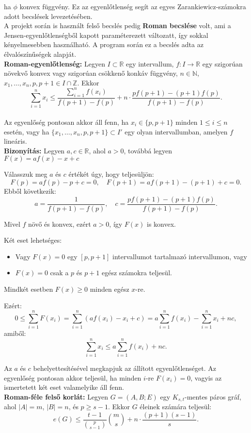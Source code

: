 \documentclass[12pt,a4paper]{article}
\begin{document}
ha $\phi$ konvex függvény. Ez az egyenlőtlenség segít az egyes Zarankiewicz-számokra adott becslések levezetésében.
\\[2mm]
A projekt során is használt felső becslés pedig \textbf{Roman becslése} volt, ami a Jensen-egyenlőtlenségből kapott paraméterezett változatt, így sokkal kényelmesebben használható. A program során ez a becslés adta az élvalószínűségek alapját.
\\[2mm]
\textbf{Roman-egyenlőtlenség:} Legyen $I \subset \mathbb{R}$ egy intervallum, $f : I \to \mathbb{R}$ egy szigorúan növekvő konvex vagy szigorúan csökkenő konkáv függvény, $n \in \mathbb{N}$, $x_1, \dots, x_n, p, p+1 \in I \cap \mathbb{Z}$. Ekkor
\[
\sum_{i=1}^{n} x_i \leq \frac{\sum_{i=1}^{n} f(x_i)}{f(p+1) - f(p)} + n \cdot \frac{p f(p+1) - (p+1) f(p)}{f(p+1) - f(p)}.
\]
\\[2mm]
Az egyenlőség pontosan akkor áll fenn, ha $x_i \in \{p, p+1\}$ minden $1 \leq i \leq n$ esetén, vagy ha $\{x_1, \dots, x_n, p, p+1\} \subset I'$ egy olyan intervallumban, amelyen $f$ lineáris.
\\[2mm]
\textbf{Bizonyítás:} Legyen $a, c \in \mathbb{R}$, ahol $a > 0$, továbbá legyen $F(x) = a f(x) - x + c$

Válasszuk meg $a$ és $c$ értékét úgy, hogy teljesüljön:
\[
F(p) = a f(p) - p + c = 0,\quad F(p+1) = a f(p+1) - (p+1) + c = 0.
\]
Ebből következik:
\[
a = \frac{1}{f(p+1) - f(p)},\quad c = \frac{p f(p+1) - (p+1) f(p)}{f(p+1) - f(p)}.
\]

Mivel $f$ növő és konvex, ezért $a > 0$, így $F(x)$ is konvex.

Két eset lehetséges:
\begin{itemize}
  \item Vagy $F(x) = 0$ egy $[p, p+1]$ intervallumot tartalmazó intervallumon, vagy
  \item $F(x) = 0$ csak a $p$ és $p+1$ egész számokra teljesül.
\end{itemize}
Mindkét esetben $F(x) \geq 0$ minden egész $x$-re.

Ezért:
\[
0 \leq \sum_{i=1}^n F(x_i) = \sum_{i=1}^n (a f(x_i) - x_i + c) = a \sum_{i=1}^n f(x_i) - \sum_{i=1}^n x_i + n c,
\]
amiből:
\[
\sum_{i=1}^n x_i \leq a \sum_{i=1}^n f(x_i) + n c.
\]

Az $a$ és $c$ behelyettesítésével megkapjuk az állított egyenlőtlenséget. Az egyenlőség pontosan akkor teljesül, ha minden $i$-re $F(x_i) = 0$, vagyis az ismertetett két eset valamelyike áll fenn.\\[2mm]
\textbf{Roman-féle felső korlát:} Legyen $G = (A, B; E)$ egy $K_{s,t}$-mentes páros gráf, ahol $|A| = m$, $|B| = n$, és $p \geq s - 1$. Ekkor $G$ éleinek számára teljesül:
\[
e(G) \leq \frac{t - 1}{\binom{p}{s - 1}} \binom{m}{s} + n \cdot \frac{(p + 1)(s - 1)}{s}.
\]
\end{document}

